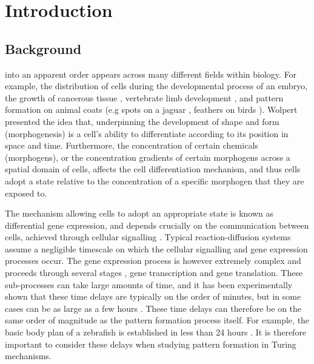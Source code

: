 \chapter{Introduction}

\section{Background}\label{section:background}

 into an apparent order appears across many different fields within biology. For example, the distribution of cells during the developmental process of an embryo, the growth of cancerous tissue \cite{morph}, vertebrate limb development \cite{miura1,glimm,miura2}, and pattern formation on animal coats (e.g spots on a jaguar \cite{painter}, feathers on birds \cite{bailleul}). Wolpert \cite{wolpert} presented the idea that, underpinning the development of shape and form (morphogenesis) is a cell's ability to differentiate according to its position in space and time. Furthermore, the concentration of certain chemicals (morphogens), or the concentration gradients of certain morphogens across a spatial domain of cells, affects the cell differentiation mechanism, and thus cells adopt a state relative to the concentration of a specific morphogen that they are exposed to.

The mechanism allowing cells to adopt an appropriate state is known as differential gene expression, and depends crucially on the communication between cells, achieved through cellular signalling \cite{gaffmonk}. Typical reaction-diffusion systems assume a negligible timescale on which the cellular signalling and gene expression processes occur. The gene expression process is however extremely complex and proceeds through several stages \cite{gaffmonk},  gene transcription and gene translation. These sub-processes can take large amounts of time, and it has been experimentally shown that these time delays are typically on the order of minutes, but in some cases can be as large as a few hours \cite{gaffmonk,tennyson}. These time delays can therefore be on the same order of magnitude as the pattern formation process itself. For example, the basic body plan of a zebrafish is established in less than 24 hours \cite{gaffmonk,kimmel}. It is therefore important to consider these delays when studying pattern formation in Turing mechanisms.

